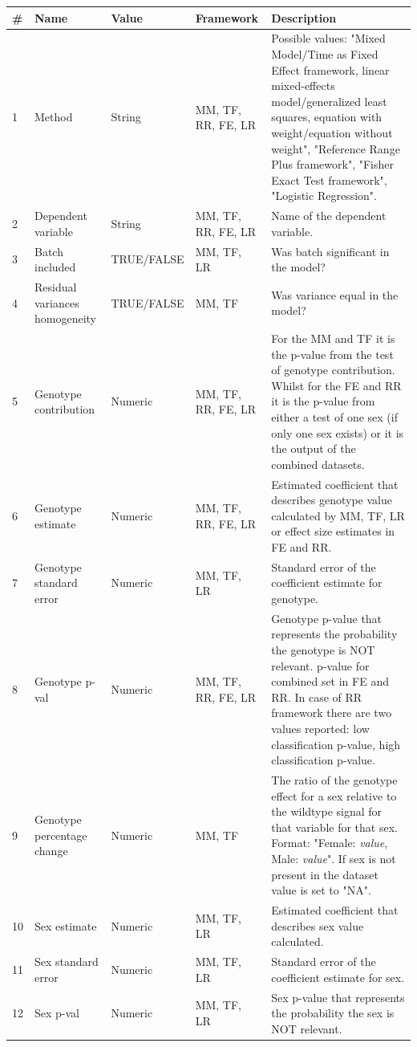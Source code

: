 \documentclass[12pt,a4paper]{article}
\begin{document}
\begin{table}
 \small
\begin{tabular}{| l | l | l | l | p{10cm} |}
  \hline
\#&Name&Value&Framework&Description\\\hline
1&Method&String&MM, TF, RR, FE, LR&Possible values: "Mixed Model/Time as Fixed Effect framework, linear mixed-effects model/generalized least squares, equation with weight/equation without weight", "Reference Range Plus framework", "Fisher Exact Test framework", "Logistic Regression".\\
2&Dependent variable&String&MM, TF, RR, FE, LR&Name of the dependent variable.\\
3&Batch included&TRUE/FALSE&MM, TF, LR &Was batch significant in the model?\\
4&Residual variances homogeneity&TRUE/FALSE&MM, TF&Was variance equal in the model?\\
5&Genotype contribution&Numeric&MM, TF, RR, FE, LR&For the MM and TF it is the p-value from the test of genotype contribution.  Whilst for the FE and RR it is the p-value from either a test of one sex (if only one sex exists) or it is the output of the combined datasets.\\
6&Genotype estimate&Numeric&MM, TF, RR, FE, LR&Estimated coefficient that describes genotype value calculated by MM, TF, LR or effect size estimates in FE and RR.\\
7&Genotype standard error&Numeric&MM, TF, LR&Standard error of the coefficient estimate for genotype.\\
8&Genotype p-val&Numeric&MM, TF, RR, FE, LR&Genotype p-value that represents the probability the genotype is NOT relevant. p-value for combined set in FE and RR. In case of RR framework there are two values reported: low classification p-value, high classification p-value.\\
9&Genotype percentage change&Numeric&MM, TF&The ratio of the genotype effect for a sex relative to the wildtype signal for that variable for that sex. Format: "Female: \textit{value}, Male: \textit{value}". If sex is not present in the dataset value is set to "NA".\\
10&Sex estimate&Numeric&MM, TF, LR&Estimated coefficient that describes sex value calculated.\\
11&Sex standard error&Numeric&MM, TF, LR&Standard error of the coefficient estimate for sex.\\
12&Sex p-val&Numeric&MM, TF, LR&Sex p-value that represents the probability the sex is NOT relevant.\\

\end{tabular}
\end{table}
\end{document}
